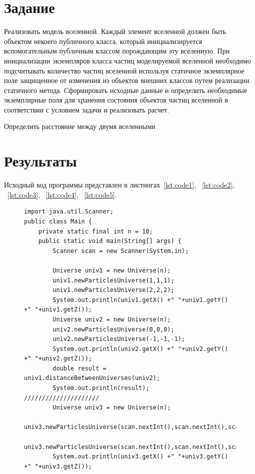 \documentclass[a4paper, 14pt]{extarticle}
\begin{document}
\renewcommand{\ttdefault}{pcr}

\setlength{\tabcolsep}{3pt}
\newpage
\setcounter{page}{2}

\section{Задание}\label{Sect::task}

Реализовать модель вселенной. Каждый элемент вселенной должен быть объектом
некоего публичного класса, который инициализируется вспомогательным публичным
классом порождающим эту вселенную. При инициализации экземпляров класса частиц
моделируемой вселенной необходимо подсчитывать количество частиц вселенной используя
статичное экземплярное поле защищенное от изменения из объектов внешних классов путем
реализации статичного метода. Сформировать исходные данные и определить необходимые
экземплярные поля для хранения состояния объектов частиц вселенной в соответствии с
условием задачи и реализовать расчет. 

Определить расстояние между двумя вселенными

\section{Результаты}\label{Sect::res}

Исходный код программы представлен в листингах~\ref{lst:code1}, ~\ref{lst:code2}, ~\ref{lst:code3}, ~\ref{lst:code4}, ~\ref{lst:code5}.

\begin{figure}[!htb]
\begin{lstlisting}[language={},caption={Нахождение расстояние между двумя вселенными(класс Mine},label={lst:code1}]
import java.util.Scanner;
public class Main {
    private static final int n = 10;
    public static void main(String[] args) {
        Scanner scan = new Scanner(System.in);

        Universe univ1 = new Universe(n);
        univ1.newParticlesUniverse(1,1,1);
        univ1.newParticlesUniverse(2,2,2);
        System.out.println(univ1.getX() +" "+univ1.getY() +" "+univ1.getZ());
        Universe univ2 = new Universe(n);
        univ2.newParticlesUniverse(0,0,0);
        univ2.newParticlesUniverse(-1,-1,-1);
        System.out.println(univ2.getX() +" "+univ2.getY() +" "+univ2.getZ());
        double result = univ1.distanceBetweenUniverses(univ2);
        System.out.println(result);
/////////////////////
        Universe univ3 = new Universe(n);
        univ3.newParticlesUniverse(scan.nextInt(),scan.nextInt(),scan.nextInt());
        univ3.newParticlesUniverse(scan.nextInt(),scan.nextInt(),scan.nextInt());
        System.out.println(univ3.getX() +" "+univ3.getY() +" "+univ3.getZ());

\end{lstlisting}
\end{figure}
\end{document}
